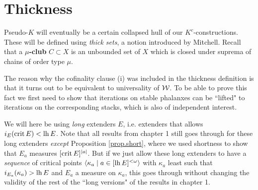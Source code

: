\section{Thickness}

Pseudo-$K$ will eventually be a certain collapsed hull of our $K^c$-constructions. These will be defined using \textit{thick sets}, a notion introduced by Mitchell. Recall that a \textbf{$\mu$-club} $C\subset X$ is an unbounded set of $X$ which is closed under suprema of chains of order type $\mu$.



The reason why the cofinality clause (i) was included in the thickness definition is that it turns out to be equivalent to universality of $\operatorname{\mathcal{W}}$. To be able to prove this fact we first need to show that iterations on stable phalanxes can be ``lifted" to iterations on the corresponding stacks, which is also of independent interest.

\qquad We will here be using \textit{long} extenders $E$, i.e. extenders that allows $i_E(\operatorname{crit} E)<\operatorname{lh} E$. Note that all results from chapter 1 still goes through for these long extenders \textit{except} Proposition \ref{prop.short}, where we used shortness to show that $E_a$ measures $[\operatorname{crit} E]^{|a|}$. But if we just allow these long extenders to have a \textit{sequence} of critical points $\langle \kappa_a\mid a\in[\operatorname{lh} E]^{<\omega}\rangle$ with $\kappa_a$ least such that $i_{E_a}(\kappa_a)>\operatorname{lh} E$ and $E_a$ a measure on $\kappa_a$, this goes through without changing the validity of the rest of the ``long versions" of the results in chapter 1.


